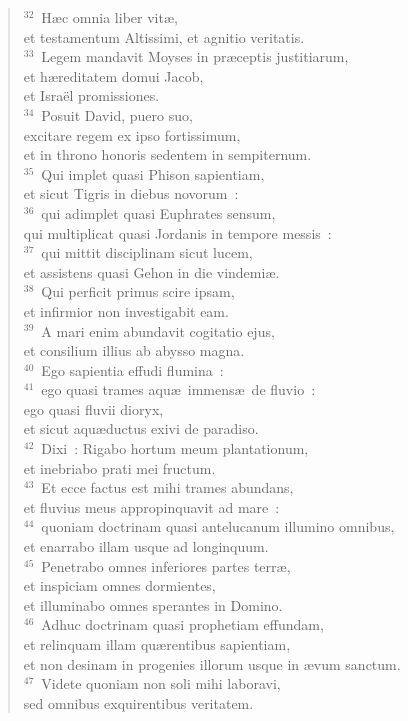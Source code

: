 \begin{verse}${}^{32}$~H\ae c omnia liber vit\ae ,\\ et testamentum Altissimi, et agnitio veritatis.\\
${}^{33}$~Legem mandavit Moyses in pr\ae ceptis justitiarum,\\ et h\ae reditatem domui Jacob,\\ et Isra\"el promissiones.\\
${}^{34}$~Posuit David, puero suo,\\ excitare regem ex ipso fortissimum,\\ et in throno honoris sedentem in sempiternum.\\
${}^{35}$~Qui implet quasi Phison sapientiam,\\ et sicut Tigris in diebus novorum~:\\
${}^{36}$~qui adimplet quasi Euphrates sensum,\\ qui multiplicat quasi Jordanis in tempore messis~:\\
${}^{37}$~qui mittit disciplinam sicut lucem,\\ et assistens quasi Gehon in die vindemi\ae .\\
${}^{38}$~Qui perficit primus scire ipsam,\\ et infirmior non investigabit eam.\\
${}^{39}$~A mari enim abundavit cogitatio ejus,\\ et consilium illius ab abysso magna.\\
${}^{40}$~Ego sapientia effudi flumina~:\\
${}^{41}$~ego quasi trames aqu\ae\ immens\ae\ de fluvio~:\\ ego quasi fluvii dioryx,\\ et sicut aqu\ae ductus exivi de paradiso.\\
${}^{42}$~Dixi~: Rigabo hortum meum plantationum,\\ et inebriabo prati mei fructum.\\
${}^{43}$~Et ecce factus est mihi trames abundans,\\ et fluvius meus appropinquavit ad mare~:\\
${}^{44}$~quoniam doctrinam quasi antelucanum illumino omnibus,\\ et enarrabo illam usque ad longinquum.\\
${}^{45}$~Penetrabo omnes inferiores partes terr\ae ,\\ et inspiciam omnes dormientes,\\ et illuminabo omnes sperantes in Domino.\\
${}^{46}$~Adhuc doctrinam quasi prophetiam effundam,\\ et relinquam illam qu\ae rentibus sapientiam,\\ et non desinam in progenies illorum usque in \ae vum sanctum.\\
${}^{47}$~Videte quoniam non soli mihi laboravi,\\ sed omnibus exquirentibus veritatem.\end{verse}


